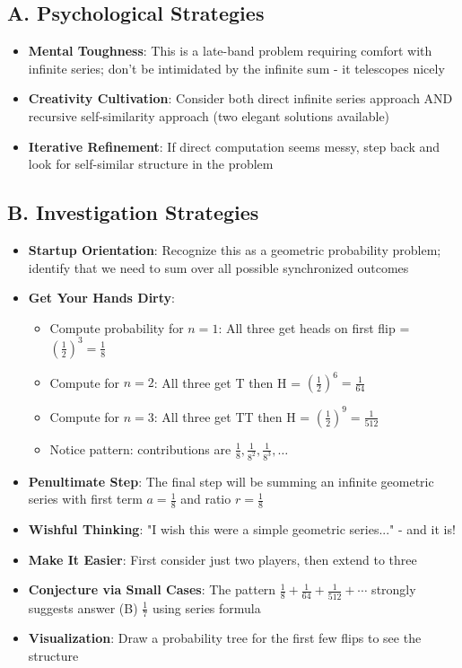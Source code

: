 \documentclass[11pt]{article}
\begin{document}
\begin{strategicbox}
\subsection*{A. Psychological Strategies}
\begin{itemize}[leftmargin=*]
    \item \textbf{Mental Toughness}: This is a late-band problem requiring comfort with infinite series; don't be intimidated by the infinite sum - it telescopes nicely
    \item \textbf{Creativity Cultivation}: Consider both direct infinite series approach AND recursive self-similarity approach (two elegant solutions available)
    \item \textbf{Iterative Refinement}: If direct computation seems messy, step back and look for self-similar structure in the problem
\end{itemize}

\subsection*{B. Investigation Strategies}
\begin{itemize}[leftmargin=*]
    \item \textbf{Startup Orientation}: Recognize this as a geometric probability problem; identify that we need to sum over all possible synchronized outcomes
    \item \textbf{Get Your Hands Dirty}: 
    \begin{itemize}
        \item Compute probability for $n=1$: All three get heads on first flip = $\left(\frac{1}{2}\right)^3 = \frac{1}{8}$
        \item Compute for $n=2$: All three get T then H = $\left(\frac{1}{2}\right)^6 = \frac{1}{64}$
        \item Compute for $n=3$: All three get TT then H = $\left(\frac{1}{2}\right)^9 = \frac{1}{512}$
        \item Notice pattern: contributions are $\frac{1}{8}, \frac{1}{8^2}, \frac{1}{8^3}, \ldots$
    \end{itemize}
    \item \textbf{Penultimate Step}: The final step will be summing an infinite geometric series with first term $a = \frac{1}{8}$ and ratio $r = \frac{1}{8}$
    \item \textbf{Wishful Thinking}: "I wish this were a simple geometric series..." - and it is!
    \item \textbf{Make It Easier}: First consider just two players, then extend to three
    \item \textbf{Conjecture via Small Cases}: The pattern $\frac{1}{8} + \frac{1}{64} + \frac{1}{512} + \cdots$ strongly suggests answer (B) $\frac{1}{7}$ using series formula
    \item \textbf{Visualization}: Draw a probability tree for the first few flips to see the structure
\end{itemize}


\end{strategicbox}
\end{document}

